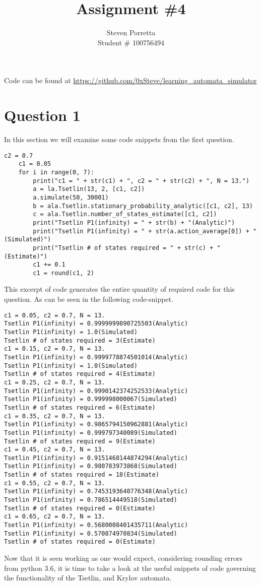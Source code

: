 \documentclass[10pt,english]{article}
\author{Steven Porretta \\ Student \# 100756494}
\title{Assignment \#4}
\date{}
\begin{document}
    \maketitle
    Code can be found at \url{https://github.com/0xSteve/learning_automata_simulator}
    \section{Question 1}
        In this section we will examine some code snippets from the first question.
    \begin{lstlisting}[label={list:first},caption=Testbench code for the Tsetlin.] 
    c2 = 0.7
    c1 = 0.05
    for i in range(0, 7):
        print("c1 = " + str(c1) + ", c2 = " + str(c2) + ", N = 13.")
        a = la.Tsetlin(13, 2, [c1, c2])
        a.simulate(50, 30001)
        b = ala.Tsetlin.stationary_probability_analytic([c1, c2], 13)
        c = ala.Tsetlin.number_of_states_estimate([c1, c2])
        print("Tsetlin P1(infinity) = " + str(b) + "(Analytic)")
        print("Tsetlin P1(infinity) = " + str(a.action_average[0]) + "(Simulated)")
        print("Tsetlin # of states required = " + str(c) + "(Estimate)")
        c1 += 0.1
        c1 = round(c1, 2)
\end{lstlisting}
This excerpt of code generates the entire quantity of required code for this question.  As can be seen in the following code-snippet.

\begin{lstlisting}[label={list:first},caption=Testbench output.] 
c1 = 0.05, c2 = 0.7, N = 13.
Tsetlin P1(infinity) = 0.9999999890725503(Analytic)
Tsetlin P1(infinity) = 1.0(Simulated)
Tsetlin # of states required = 3(Estimate)
c1 = 0.15, c2 = 0.7, N = 13.
Tsetlin P1(infinity) = 0.9999778874501014(Analytic)
Tsetlin P1(infinity) = 1.0(Simulated)
Tsetlin # of states required = 4(Estimate)
c1 = 0.25, c2 = 0.7, N = 13.
Tsetlin P1(infinity) = 0.9990142374252533(Analytic)
Tsetlin P1(infinity) = 0.999998000067(Simulated)
Tsetlin # of states required = 6(Estimate)
c1 = 0.35, c2 = 0.7, N = 13.
Tsetlin P1(infinity) = 0.9865794150962881(Analytic)
Tsetlin P1(infinity) = 0.999797340089(Simulated)
Tsetlin # of states required = 9(Estimate)
c1 = 0.45, c2 = 0.7, N = 13.
Tsetlin P1(infinity) = 0.9151468144874294(Analytic)
Tsetlin P1(infinity) = 0.980783973868(Simulated)
Tsetlin # of states required = 18(Estimate)
c1 = 0.55, c2 = 0.7, N = 13.
Tsetlin P1(infinity) = 0.7453193640776348(Analytic)
Tsetlin P1(infinity) = 0.786514449518(Simulated)
Tsetlin # of states required = 0(Estimate)
c1 = 0.65, c2 = 0.7, N = 13.
Tsetlin P1(infinity) = 0.5680008401435711(Analytic)
Tsetlin P1(infinity) = 0.570874970834(Simulated)
Tsetlin # of states required = 0(Estimate)
\end{lstlisting}
Now that it is seen working as one would expect, considering rounding errors from python 3.6, it is time to take a look at the useful snippets of code governing the functionality of the Tsetlin, and Krylov automata.
\end{document}
